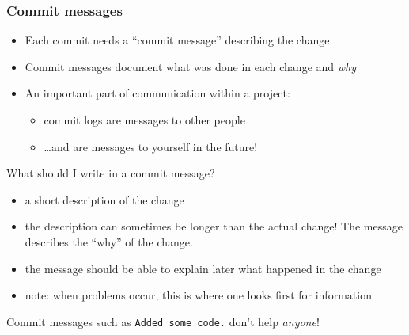 \begin{frame}[fragile]
\frametitle{Commit messages}

\begin{itemize}
    \item Each commit needs a \enquote{commit message} describing the change
    \item Commit messages document what was done in each change and \emph{why}
    \item An important part of communication within a project:
        \begin{itemize}
            \item commit logs are messages to other people
            \item \ldots and are messages to yourself in the future!
        \end{itemize}
\end{itemize}

\begin{alertblock}{What should I write in a commit message?}
    \vspace*{-4mm}
    \begin{itemize}
        \item a short description of the change
        \item the description can sometimes be longer than the actual
            change!  The message describes the \enquote{why} of the change.
        \item the message should be able to explain later what happened in
            the change
        \item note: when problems occur, this is where one looks first for
            information
    \end{itemize}
\end{alertblock}
\vspace*{-5mm}
\begin{center}
{\large
    Commit messages such as \lstinline{Added some code.} don't help
    \emph{anyone}!
}
\end{center}

\end{frame}

